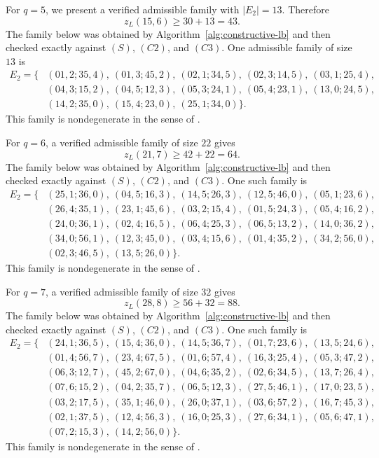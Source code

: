 \documentclass[10pt]{article}
\newcommand{\blue}[1]{#1}
\newcommand{\0}{\mathbf{0}}
\newcommand{\1}{\mathbf{1}}
\begin{document}
For \(q=5\), we present a verified admissible family with \(|E_2|=13\). Therefore
\[
z_L(15,6)\ge 30+13=43.
\]
\blue{The family below was obtained by Algorithm~\ref{alg:constructive-lb} and then checked exactly against \((S)\), \((C2)\), and \((C3)\).}
\blue{One admissible family of size \(13\) is}
\[
\blue{\begin{aligned}
E_2=\{&(01,2;35,4),\ (01,3;45,2),\ (02,1;34,5),\ (02,3;14,5),\ (03,1;25,4),\\
&(04,3;15,2),\ (04,5;12,3),\ (05,3;24,1),\ (05,4;23,1),\ (13,0;24,5),\\
&(14,2;35,0),\ (15,4;23,0),\ (25,1;34,0)\}.
\end{aligned}}
\]
\blue{This family is nondegenerate in the sense of \cite{QCX26a}.}

\blue{For \(q=6\), a verified admissible family of size \(22\) gives}
\[
\blue{z_L(21,7)\ge 42+22=64.}
\]
\blue{The family below was obtained by Algorithm~\ref{alg:constructive-lb} and then checked exactly against \((S)\), \((C2)\), and \((C3)\).}
\blue{One such family is}
\[
\blue{\begin{aligned}
E_2=\{&(25,1;36,0),\ (04,5;16,3),\ (14,5;26,3),\ (12,5;46,0),\ (05,1;23,6),\\
&(26,4;35,1),\ (23,1;45,6),\ (03,2;15,4),\ (01,5;24,3),\ (05,4;16,2),\\
&(24,0;36,1),\ (02,4;16,5),\ (06,4;25,3),\ (06,5;13,2),\ (14,0;36,2),\\
&(34,0;56,1),\ (12,3;45,0),\ (03,4;15,6),\ (01,4;35,2),\ (34,2;56,0),\\
&(02,3;46,5),\ (13,5;26,0)\}.
\end{aligned}}
\]
\blue{This family is nondegenerate in the sense of \cite{QCX26a}.}

\blue{For \(q=7\), a verified admissible family of size \(32\) gives}
\[
\blue{z_L(28,8)\ge 56+32=88.}
\]
\blue{The family below was obtained by Algorithm~\ref{alg:constructive-lb} and then checked exactly against \((S)\), \((C2)\), and \((C3)\).}
\blue{One such family is}
\[
\blue{\begin{aligned}
E_2=\{&(24,1;36,5),\ (15,4;36,0),\ (14,5;36,7),\ (01,7;23,6),\ (13,5;24,6),\\
&(01,4;56,7),\ (23,4;67,5),\ (01,6;57,4),\ (16,3;25,4),\ (05,3;47,2),\\
&(06,3;12,7),\ (45,2;67,0),\ (04,6;35,2),\ (02,6;34,5),\ (13,7;26,4),\\
&(07,6;15,2),\ (04,2;35,7),\ (06,5;12,3),\ (27,5;46,1),\ (17,0;23,5),\\
&(03,2;17,5),\ (35,1;46,0),\ (26,0;37,1),\ (03,6;57,2),\ (16,7;45,3),\\
&(02,1;37,5),\ (12,4;56,3),\ (16,0;25,3),\ (27,6;34,1),\ (05,6;47,1),\\
&(07,2;15,3),\ (14,2;56,0)\}.
\end{aligned}}
\]
\blue{This family is nondegenerate in the sense of \cite{QCX26a}.}
\end{document}
